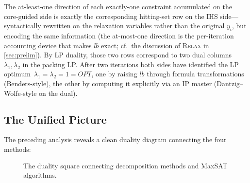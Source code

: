 The at-least-one direction of each exactly-one constraint accumulated on the
core-guided side is exactly the corresponding hitting-set row on the IHS
side---syntactically rewritten on the relaxation variables rather than the
original $y_i$, but encoding the same information (the at-most-one direction
is the per-iteration accounting device that makes $\mathit{lb}$ exact;
cf.\ the discussion of \textsc{Relax} in \cref{sec:prelim}). By LP duality, those two rows correspond to two dual
columns $\lambda_1, \lambda_2$ in the packing LP. After two iterations both
sides have identified the LP optimum~$\lambda_1 = \lambda_2 = 1 = \mathit{OPT}$,
one by raising $\mathit{lb}$ through formula transformations (Benders-style),
the other by computing it explicitly via an IP master (Dantzig--Wolfe-style on
the dual).

\subsection{The Unified Picture}
\label{sec:unified}

The preceding analysis reveals a clean duality diagram connecting the four
methods:

\begin{figure}[htbp]
\centering
{}
\caption{The duality square connecting decomposition methods and MaxSAT algorithms.}
\label{fig:square}
\end{figure}

